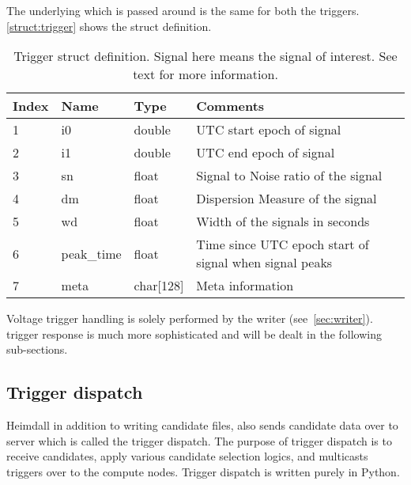 \par The underlying \struct which is passed around is the same for both the triggers. \autoref{struct:trigger} shows the struct definition. 
\begin{table}
	\begin{tabular}{llll} \toprule
			Index & Name       & Type          & Comments                                               \\ \midrule
			1     & i0         & double        & UTC start epoch of signal                              \\
			2     & i1         & double        & UTC end   epoch of signal                              \\
			3     & sn         & float         & Signal to Noise ratio of the signal                    \\
			4     & dm         & float         & Dispersion Measure of the signal                       \\
			5     & wd         & float         & Width of the signals in seconds                        \\
			6     & peak\_time & float         & Time since UTC epoch start of signal when signal peaks \\
			7     & meta       & char{[}128{]} & Meta information                                     \\
			\bottomrule
	\end{tabular}
	\caption {Trigger struct definition. Signal here means the signal of interest. See text for more information.}
	\label{struct:trigger}
\end{table}

\par Voltage trigger handling is solely performed by the writer (see~\autoref{sec:writer}). \dbson trigger response is much more sophisticated and will be dealt in the following sub-sections.

\subsection {Trigger dispatch}

\par Heimdall in addition to writing candidate files, also sends candidate data over to server which is called the trigger dispatch. 
The purpose of trigger dispatch is to receive candidates, apply various candidate selection logics, and multicasts triggers over to the compute nodes. 
Trigger dispatch is written purely in Python.

